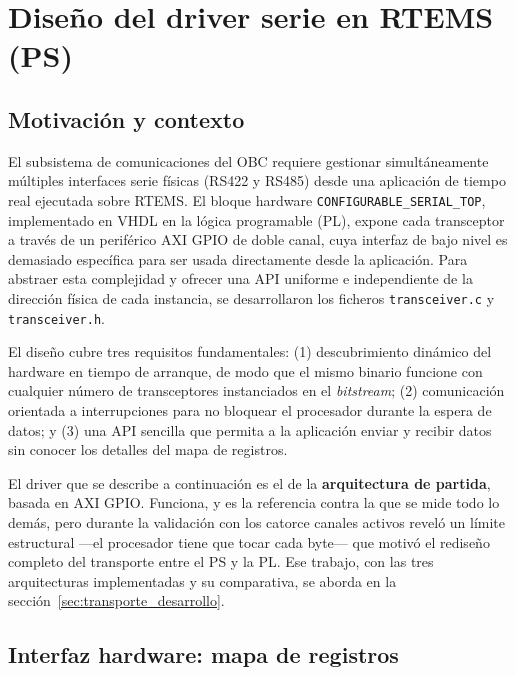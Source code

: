 \section{Diseño del driver serie en RTEMS (PS)}

\subsection{Motivación y contexto}

El subsistema de comunicaciones del OBC requiere gestionar simultáneamente múltiples
interfaces serie físicas (RS422 y RS485) desde una aplicación de tiempo real ejecutada sobre
RTEMS. El bloque hardware \texttt{CONFIGURABLE\_SERIAL\_TOP}, implementado en VHDL en
la lógica programable (PL), expone cada transceptor a través de un periférico AXI GPIO de
doble canal, cuya interfaz de bajo nivel es demasiado específica para ser usada directamente
desde la aplicación. Para abstraer esta complejidad y ofrecer una API uniforme e
independiente de la dirección física de cada instancia, se desarrollaron los ficheros
\texttt{transceiver.c} y \texttt{transceiver.h}.

El diseño cubre tres requisitos fundamentales: (1) descubrimiento dinámico del hardware en
tiempo de arranque, de modo que el mismo binario funcione con cualquier número de
transceptores instanciados en el \textit{bitstream}; (2) comunicación orientada a interrupciones
para no bloquear el procesador durante la espera de datos; y (3) una API sencilla que
permita a la aplicación enviar y recibir datos sin conocer los detalles del mapa de registros.

El driver que se describe a continuación es el de la \textbf{arquitectura de partida}, basada en
AXI GPIO. Funciona, y es la referencia contra la que se mide todo lo demás, pero durante la
validación con los catorce canales activos reveló un límite estructural ---el procesador tiene
que tocar cada byte--- que motivó el rediseño completo del transporte entre el PS y la PL. Ese
trabajo, con las tres arquitecturas implementadas y su comparativa, se aborda en la
sección~\ref{sec:transporte_desarrollo}.

\subsection{Interfaz hardware: mapa de registros}

